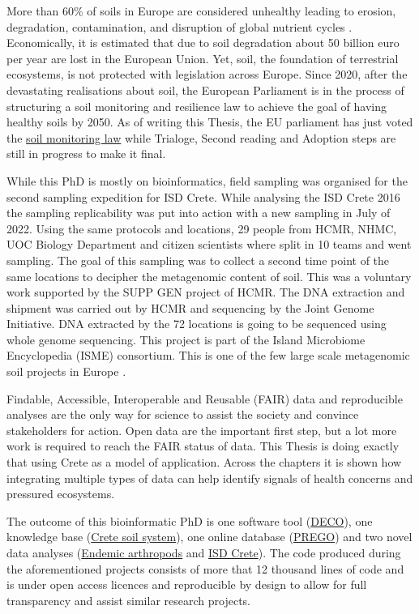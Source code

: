 More than 60\% of
soils in Europe are considered unhealthy leading to erosion, degradation, contamination,
and disruption of global nutrient cycles \parencite{commission2020caring}.
Economically, it is estimated that due to soil degradation about 50 billion euro per year
are lost in the European Union. 
Yet, soil, the foundation of 
terrestrial ecosystems, is not protected with legislation across Europe.
Since 2020, after the devastating realisations about soil, the European Parliament 
is in the process of structuring a soil monitoring and resilience law to achieve 
the goal of having healthy soils by 2050. As of writing this Thesis, the EU 
parliament has just voted the \href{https://www.europarl.europa.eu/thinktank/en/document/EPRS_BRI(2024)757627}{soil monitoring law}
while Trialoge, Second reading and Adoption steps are still in progress to make it final.

While this PhD is mostly on bioinformatics, field sampling was organised
for the second sampling expedition for ISD Crete.
While analysing the ISD Crete 2016 the sampling replicability was put into action with a 
new sampling in July of 2022.
Using the same protocols and locations, 29 people from HCMR, NHMC, UOC Biology
Department and citizen scientists where split in 10 teams and went sampling. 
The goal of this sampling was to collect a second time point of the same locations
to decipher the metagenomic content of soil. This was a voluntary work supported 
by the SUPP GEN project of HCMR. The DNA extraction and shipment was carried out 
by HCMR and sequencing by the Joint Genome Initiative. DNA extracted by the 72 locations 
is going to be sequenced using whole genome sequencing. 
This project is part of the Island Microbiome Encyclopedia (ISME) consortium.
This is one of the few large scale metagenomic soil projects in
Europe \parencite{nayfach2021a-genomic, ma2023a-genomic}.

Findable, Accessible, Interoperable and Reusable (FAIR) data and reproducible analyses
are the only way for science to assist the society and convince stakeholders for action. 
Open data are the important first step, but a lot more work is required to reach 
the FAIR status of data.
This Thesis is doing exactly that using Crete as a model of application. Across the chapters it is shown how 
integrating multiple types of data can help identify signals of health concerns and 
pressured ecosystems.

The outcome of this bioinformatic PhD is one software tool (\hyperref[cha:deco]{DECO}),
one knowledge base (\hyperref[cha:crete-idea]{Crete soil system}), one online
database (\hyperref[cha:prego]{PREGO}) and
two novel data analyses (\hyperref[cha:arthropods]{Endemic arthropods} and \hyperref[cha:isd-crete-soil]{ISD Crete}).
The code produced during the aforementioned projects consists of more that 12 thousand lines of code 
and is under open access licences and reproducible by design to allow for full transparency and assist similar research projects. 
